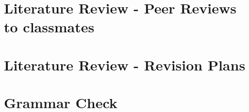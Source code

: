 \documentclass{article}
\begin{document}
\section{Literature Review - Peer Reviews to classmates}


\newpage

\section{Literature Review - Revision Plans}


\newpage

\section{Grammar Check}


\newpage
\end{document}
